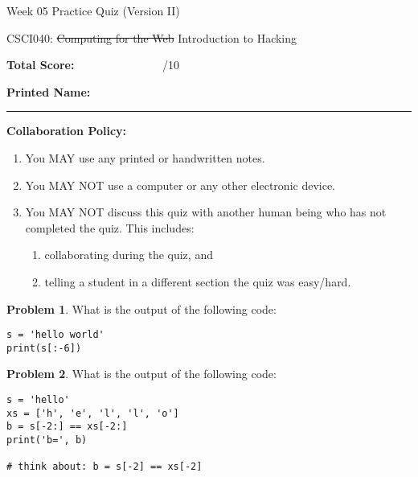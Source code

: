 \documentclass[10pt]{article}
\theoremstyle{definition}
\newtheorem{problem}{Problem}
\begin{document}
\begin{center}
    {
\Large
    Week 05 Practice Quiz (Version II)
}

    \vspace{0.1in}
    CSCI040: \sout{Computing for the Web} Introduction to Hacking

    \vspace{0.1in}
\end{center}


\vspace{0.15in}
\noindent
\textbf{Total Score:} ~~~~~~~~~~~~~~~/10

\vspace{0.5in}
\noindent
\textbf{Printed Name:}

\noindent
\rule{\textwidth}{0.1pt}
\vspace{0.25in}

\noindent
\textbf{Collaboration Policy:}
\begin{enumerate}
    \item You MAY use any printed or handwritten notes.
    \item You MAY NOT use a computer or any other electronic device.
    \item You MAY NOT discuss this quiz with another human being who has not completed the quiz.
        This includes:
        \begin{enumerate}
            \item collaborating during the quiz, and
            \item telling a student in a different section the quiz was easy/hard.
        \end{enumerate}
\end{enumerate}

\vspace{0.15in}

\begin{problem}
    What is the output of the following code:
\end{problem}
\begin{lstlisting}
s = 'hello world'
print(s[:-6])
\end{lstlisting}
\vspace{1in}

\begin{problem}
    What is the output of the following code:
\end{problem}
\begin{lstlisting}
s = 'hello'
xs = ['h', 'e', 'l', 'l', 'o']
b = s[-2:] == xs[-2:]
print('b=', b)

# think about: b = s[-2] == xs[-2]
\end{lstlisting}
\vspace{1.5in}
\end{document}
